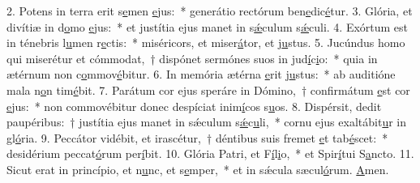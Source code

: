 2. Potens in terra erit s\uline{e}men \uline{e}jus:~* generátio rectórum ben\uline{e}dic\uline{é}tur.
3. Glória, et divítiæ in d\uline{o}mo \uline{e}jus:~* et justítia ejus manet in s\uline{ǽ}culum s\uline{ǽ}culi.
4. Exórtum est in ténebris l\uline{u}men r\uline{e}ctis:~* miséricors, et miser\uline{á}tor, et j\uline{u}stus.
5. Jucúndus homo qui miserétur et cómmodat,~† dispónet sermónes suos in jud\uline{í}c\uline{i}o:~* quia in ætérnum non c\uline{o}mmov\uline{é}bitur.
6. In memória ætérna \uline{e}rit j\uline{u}stus:~* ab auditióne mala n\uline{o}n tim\uline{é}bit.
7. Parátum cor ejus speráre in Dómino,~† confirmátum \uline{e}st cor \uline{e}jus:~* non commovébitur donec despíciat inim\uline{í}cos s\uline{u}os.
8. Dispérsit, dedit paupéribus:~† justítia ejus manet in sǽculum s\uline{ǽ}c\uline{u}li,~* cornu ejus exaltábit\uline{u}r in gl\uline{ó}ria.
9. Peccátor vidébit, et irascétur,~† déntibus suis fremet \uline{e}t tab\uline{é}scet:~* desidérium peccat\uline{ó}rum per\uline{í}bit.
10. Glória Patri, et F\uline{í}l\uline{i}o,~* et Spir\uline{í}tui S\uline{a}ncto.
11. Sicut erat in princípio, et n\uline{u}nc, et s\uline{e}mper,~* et in sǽcula sæcul\uline{ó}rum. \uline{A}men.
